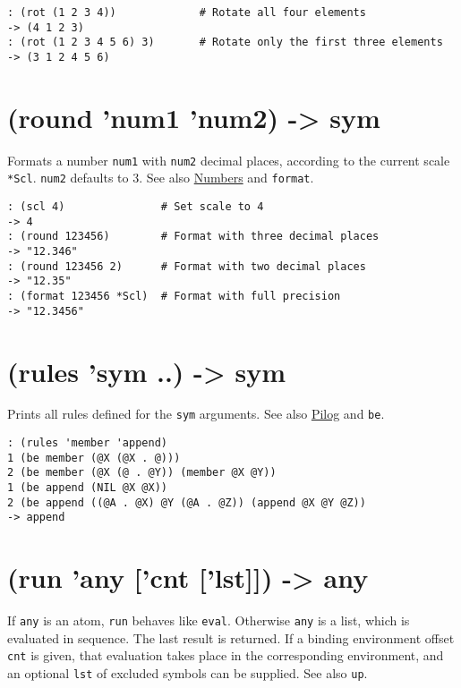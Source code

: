 {{{{{{{{\begin{verbatim}
: (rot (1 2 3 4))             # Rotate all four elements
-> (4 1 2 3)
: (rot (1 2 3 4 5 6) 3)       # Rotate only the first three elements
-> (3 1 2 4 5 6)
\end{verbatim}

 
\section{(round 'num1 'num2) -> sym}
\label{sec-8-1-18-30}


Formats a number \texttt{num1} with \texttt{num2} decimal places, according to the
current scale \texttt{*Scl}. \texttt{num2} defaults to 3. See also
\hyperref[ref.html-num-io]{Numbers} and \texttt{format}.


\begin{verbatim}
: (scl 4)               # Set scale to 4
-> 4
: (round 123456)        # Format with three decimal places
-> "12.346"
: (round 123456 2)      # Format with two decimal places
-> "12.35"
: (format 123456 *Scl)  # Format with full precision
-> "12.3456"
\end{verbatim}

 
\section{(rules 'sym ..) -> sym}
\label{sec-8-1-18-31}


Prints all rules defined for the \texttt{sym} arguments. See also
\hyperref[ref.html-pilog]{Pilog} and \texttt{be}.


\begin{verbatim}
: (rules 'member 'append)
1 (be member (@X (@X . @)))
2 (be member (@X (@ . @Y)) (member @X @Y))
1 (be append (NIL @X @X))
2 (be append ((@A . @X) @Y (@A . @Z)) (append @X @Y @Z))
-> append
\end{verbatim}

 
\section{(run 'any ['cnt ['lst]]) -> any}
\label{sec-8-1-18-32}


If \texttt{any} is an atom, \texttt{run} behaves like \texttt{eval}. Otherwise \texttt{any} is a
list, which is evaluated in sequence. The last result is returned. If a
binding environment offset \texttt{cnt} is given, that evaluation takes place
in the corresponding environment, and an optional \texttt{lst} of excluded
symbols can be supplied. See also \texttt{up}.


}}}}}}}}
